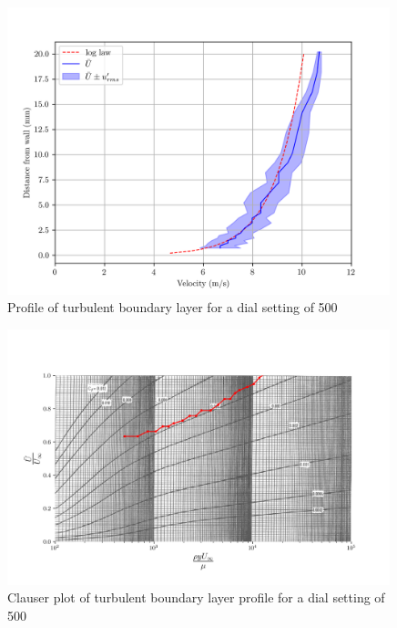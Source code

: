 \documentclass{article}
\begin{document}

\begin{figure}[H]
    \centering
    \includegraphics[width=0.99\textwidth]{turbulent_profile.png}
    \caption{Profile of turbulent boundary layer for a dial setting of 500}
    \label{fig:turbulent_profile}
\end{figure}

\begin{figure}[H]
    \centering
    \includegraphics[width=0.99\textwidth]{clauser_data.png}
    \caption{Clauser plot of turbulent boundary layer profile for a dial setting of 500 \cite{handout}}
    \label{fig:clauser}
\end{figure}
\end{document}
